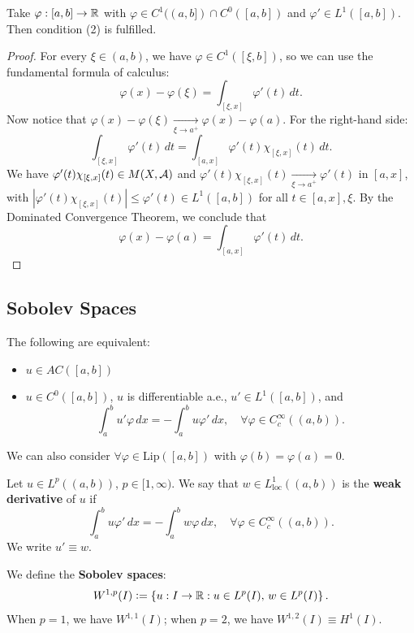 \begin{remark}
Take $\varphi: [a,b] \to \mathbb{R}$ with $\varphi \in C^1((a,b]) \cap C^0([a,b])$ and $\varphi' \in L^1([a,b])$. Then condition (2) is fulfilled.
\end{remark}
\begin{proof}
For every $\xi \in (a,b)$, we have $\varphi \in C^1([\xi,b])$, so we can use the fundamental formula of calculus:
\[
\varphi(x) - \varphi(\xi) = \int_{[\xi,x]} \varphi'(t) \, dt.
\]
Now notice that $\varphi(x) - \varphi(\xi) \xrightarrow[\xi \to a^+]{} \varphi(x) - \varphi(a)$. For the right-hand side:
\[
\int_{[\xi,x]} \varphi'(t) \, dt = \int_{[a,x]} \varphi'(t) \chi_{[\xi,x]}(t) \, dt.
\]
We have $\varphi'(t) \chi_{[\xi,x]}(t) \in M(X, \mathcal{A})$ and $\varphi'(t) \chi_{[\xi,x]}(t) \xrightarrow[\xi \to a^+]{} \varphi'(t)$ in $[a,x]$, with $|\varphi'(t) \chi_{[\xi,x]}(t)| \leq \varphi'(t) \in L^1([a,b])$ for all $t \in [a,x], \xi$. By the Dominated Convergence Theorem, we conclude that
\[
\varphi(x) - \varphi(a) = \int_{[a,x]} \varphi'(t) \, dt.
\]
\end{proof}

\subsection{Sobolev Spaces}

\begin{proposition}
The following are equivalent:
\begin{itemize}
\item $u \in AC([a,b])$
\item $u \in C^0([a,b])$, $u$ is differentiable a.e., $u' \in L^1([a,b])$, and
\[
\int_a^b u' \varphi \, dx = -\int_a^b u \varphi' \, dx, \quad \forall \varphi \in C_c^\infty((a,b)).
\]
\end{itemize}
We can also consider $\forall \varphi \in \text{Lip}([a,b])$ with $\varphi(b) = \varphi(a) = 0$.
\end{proposition}

\begin{definition}
Let $u \in L^p((a,b))$, $p \in [1,\infty)$. We say that $w \in L_{\text{loc}}^1((a,b))$ is the \textbf{weak derivative} of $u$ if
\[
\int_a^b u \varphi' \, dx = -\int_a^b w \varphi \, dx, \quad \forall \varphi \in C_c^\infty((a,b)).
\]
We write $u' \equiv w$.
\end{definition}

\begin{definition}
We define the \textbf{Sobolev spaces}:
\[
W^{1,p}(I) \mathrel{\mathop:}= \left\{ u: I \to \mathbb{R} : u \in L^p(I), \, w \in L^p(I) \right\}.
\]
When $p = 1$, we have $W^{1,1}(I)$; when $p = 2$, we have $W^{1,2}(I) \equiv H^1(I)$.
\end{definition}


